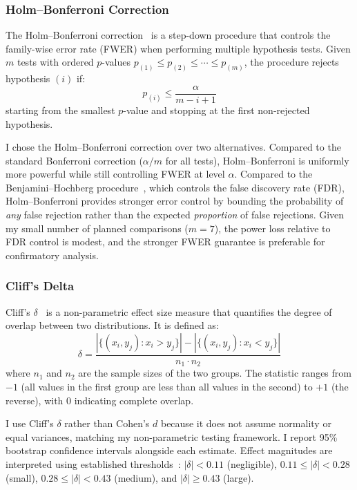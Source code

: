 \documentclass[11pt]{article}
\begin{document}
\subsubsection{Holm--Bonferroni Correction}
\label{sec:holm_bonferroni}

The Holm--Bonferroni correction~\cite{holm1979simple} is a step-down procedure
that controls the family-wise error rate (FWER) when performing multiple
hypothesis tests. Given $m$ tests with ordered $p$-values $p_{(1)} \leq
p_{(2)} \leq \cdots \leq p_{(m)}$, the procedure rejects hypothesis $(i)$ if:
\begin{equation}
  p_{(i)} \leq \frac{\alpha}{m - i + 1}
\end{equation}
starting from the smallest $p$-value and stopping at the first non-rejected
hypothesis.

I chose the Holm--Bonferroni correction over two alternatives. Compared to the
standard Bonferroni correction ($\alpha/m$ for all tests), Holm--Bonferroni is
uniformly more powerful while still controlling FWER at level $\alpha$. Compared
to the Benjamini--Hochberg procedure~\cite{benjamini1995controlling}, which
controls the false discovery rate (FDR), Holm--Bonferroni provides stronger
error control by bounding the probability of \emph{any} false rejection rather
than the expected \emph{proportion} of false rejections. Given my small number
of planned comparisons ($m = 7$), the power loss relative to FDR control is
modest, and the stronger FWER guarantee is preferable for confirmatory analysis.

\subsubsection{Cliff's Delta}
\label{sec:cliffs_delta}

Cliff's $\delta$~\cite{cliff1993dominance} is a non-parametric effect size
measure that quantifies the degree of overlap between two distributions. It is
defined as:
\begin{equation}
  \delta = \frac{\left|\{(x_i, y_j) : x_i > y_j\}\right| -
                  \left|\{(x_i, y_j) : x_i < y_j\}\right|}{n_1 \cdot n_2}
\end{equation}
where $n_1$ and $n_2$ are the sample sizes of the two groups. The statistic
ranges from $-1$ (all values in the first group are less than all values in the
second) to $+1$ (the reverse), with 0 indicating complete overlap.

I use Cliff's $\delta$ rather than Cohen's $d$ because it does not assume
normality or equal variances, matching my non-parametric testing framework. I
report 95\% bootstrap confidence intervals alongside each estimate. Effect
magnitudes are interpreted using established thresholds~\cite{romano2006appropriate}:
$|\delta| < 0.11$ (negligible), $0.11 \leq |\delta| < 0.28$ (small),
$0.28 \leq |\delta| < 0.43$ (medium), and $|\delta| \geq 0.43$ (large).
\end{document}
